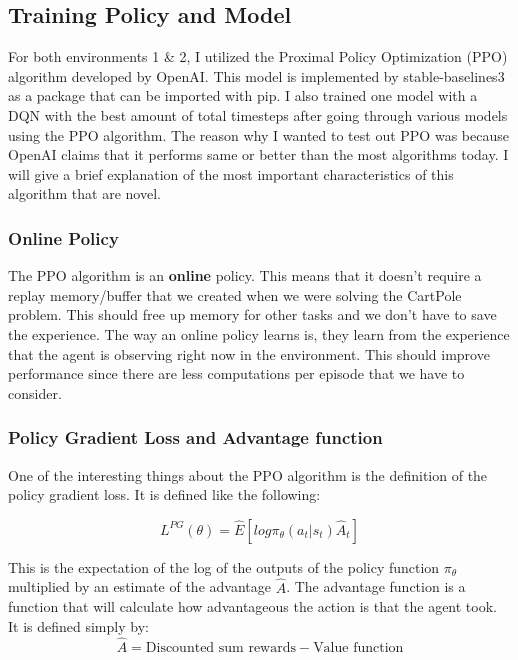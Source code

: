 \documentclass{article}
\numberwithin{equation}{section}
\numberwithin{equation}{section}
\begin{document}
\subsection*{Training Policy and Model}

For both environments 1 \& 2, I utilized the Proximal Policy Optimization (PPO) algorithm developed by OpenAI. This model is implemented by stable-baselines3 as a package that can be imported with pip. I also trained one model with a DQN with the best amount of total timesteps after going through various models using the PPO algorithm. The reason why I wanted to test out PPO was because OpenAI claims that it performs same or better than the most algorithms today. I will give a brief explanation of the most important characteristics of this algorithm that are novel.

\subsubsection*{Online Policy}
The PPO algorithm is an \textbf{online} policy. This means that it doesn't require a replay memory/buffer that we created when we were solving the CartPole problem. This should free up memory for other tasks and we don't have to save the experience. The way an online policy learns is, they learn from the experience that the agent is observing right now in the environment. This should improve performance since there are less computations per episode that we have to consider.  

\subsubsection*{Policy Gradient Loss and Advantage function}

One of the interesting things about the PPO algorithm is the definition of the policy gradient loss. It is defined like the following:

$$
L^{PG}(\theta) = \hat{E} \left[log \pi_{\theta}(a_t | s_t) \hat{A}_t \right]
$$

This is the expectation of the log of the outputs of the policy function $\pi_{\theta}$ multiplied by an estimate of the advantage $\hat{A}$. The advantage function is a function that will calculate how advantageous the action is that the agent took. It is defined simply by:
$$
\hat{A} = \textrm{Discounted sum rewards} - \textrm{Value function} 
$$
\end{document}
